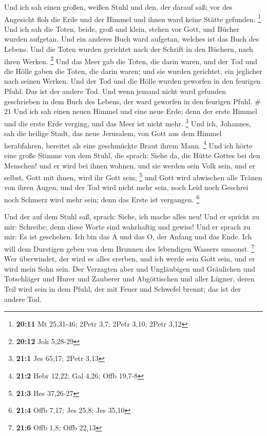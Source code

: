  Und ich sah einen großen, weißen Stuhl und den, der darauf
saß; vor des Angesicht floh die Erde und der Himmel und ihnen ward keine
Stätte gefunden. \footnote{\textbf{20:11} Mt 25,31-46; 2Petr 3,7; 2Petr
  3,10; 2Petr 3,12}  Und ich sah die Toten, beide, groß und
klein, stehen vor Gott, und Bücher wurden aufgetan. Und ein anderes Buch
ward aufgetan, welches ist das Buch des Lebens. Und die Toten wurden
gerichtet nach der Schrift in den Büchern, nach ihren Werken.
\footnote{\textbf{20:12} Joh 5,28-29}  Und das Meer gab die
Toten, die darin waren, und der Tod und die Hölle gaben die Toten, die
darin waren; und sie wurden gerichtet, ein jeglicher nach seinen Werken.
 Und der Tod und die Hölle wurden geworfen in den feurigen
Pfuhl. Das ist der andere Tod.  Und wenn jemand nicht ward
gefunden geschrieben in dem Buch des Lebens, der ward geworfen in den
feurigen Pfuhl. \# 21  Und ich sah einen neuen Himmel und
eine neue Erde; denn der erste Himmel und die erste Erde verging, und
das Meer ist nicht mehr. \footnote{\textbf{21:1} Jes 65,17; 2Petr 3,13}
 Und ich, Johannes, sah die heilige Stadt, das neue
Jerusalem, von Gott aus dem Himmel herabfahren, bereitet als eine
geschmückte Braut ihrem Mann. \footnote{\textbf{21:2} Hebr 12,22; Gal
  4,26; Offb 19,7-8}  Und ich hörte eine große Stimme von
dem Stuhl, die sprach: Siehe da, die Hütte Gottes bei den Menschen! und
er wird bei ihnen wohnen, und sie werden sein Volk sein, und er selbst,
Gott mit ihnen, wird ihr Gott sein; \footnote{\textbf{21:3} Hes 37,26-27}
 und Gott wird abwischen alle Tränen von ihren Augen, und
der Tod wird nicht mehr sein, noch Leid noch Geschrei noch Schmerz wird
mehr sein; denn das Erste ist vergangen. \footnote{\textbf{21:4} Offb
  7,17; Jes 25,8; Jes 35,10}

 Und der auf dem Stuhl saß, sprach: Siehe, ich mache alles
neu! Und er spricht zu mir: Schreibe; denn diese Worte sind wahrhaftig
und gewiss!  Und er sprach zu mir: Es ist geschehen. Ich bin
das A und das O, der Anfang und das Ende. Ich will dem Durstigen geben
von dem Brunnen des lebendigen Wassers umsonst. \footnote{\textbf{21:6}
  Offb 1,8; Offb 22,13}  Wer überwindet, der wird es alles
ererben, und ich werde sein Gott sein, und er wird mein Sohn sein.
 Der Verzagten aber und Ungläubigen und Gräulichen und
Totschläger und Hurer und Zauberer und Abgöttischen und aller Lügner,
deren Teil wird sein in dem Pfuhl, der mit Feuer und Schwefel brennt;
das ist der andere Tod.

